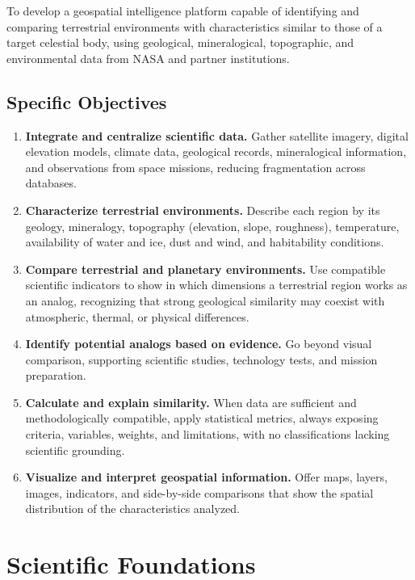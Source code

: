 \documentclass[12pt,letterpaper]{article}
\begin{document}
To develop a geospatial intelligence platform capable of identifying and comparing terrestrial environments with characteristics similar to those of a target celestial body, using geological, mineralogical, topographic, and environmental data from NASA and partner institutions.

\subsection{Specific Objectives}

\begin{enumerate}
  \item \textbf{Integrate and centralize scientific data.} Gather satellite imagery, digital elevation models, climate data, geological records, mineralogical information, and observations from space missions, reducing fragmentation across databases.
  \item \textbf{Characterize terrestrial environments.} Describe each region by its geology, mineralogy, topography (elevation, slope, roughness), temperature, availability of water and ice, dust and wind, and habitability conditions.
  \item \textbf{Compare terrestrial and planetary environments.} Use compatible scientific indicators to show in which dimensions a terrestrial region works as an analog, recognizing that strong geological similarity may coexist with atmospheric, thermal, or physical differences.
  \item \textbf{Identify potential analogs based on evidence.} Go beyond visual comparison, supporting scientific studies, technology tests, and mission preparation.
  \item \textbf{Calculate and explain similarity.} When data are sufficient and methodologically compatible, apply statistical metrics, always exposing criteria, variables, weights, and limitations, with no classifications lacking scientific grounding.
  \item \textbf{Visualize and interpret geospatial information.} Offer maps, layers, images, indicators, and side-by-side comparisons that show the spatial distribution of the characteristics analyzed.
\end{enumerate}

\section{Scientific Foundations}
\end{document}
